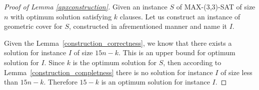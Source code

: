 \begin{proof}[Proof of Lemma \ref{apxconstruction}]
Given an instance $S$ of MAX-(3,3)-SAT of size $n$
with optimum solution satisfying $k$ clauses.
Let us construct an instance of geometric cover for $S$,
constructed in afrementioned manner and name it $I$.

Given the Lemma~\ref{construction_correctness}, we know
that there exists a solution for instance $I$ of size $15n - k$.
This is an upper bound for optimum solution for $I$.
Since $k$ is the optimum solution
for $S$, then according to Lemma~\ref{construction_completness}
there is no solution 
for instance $I$
of size less than $15n - k$.
Therefore $15 - k$ is an optimum solution for instance $I$.
\end{proof}
